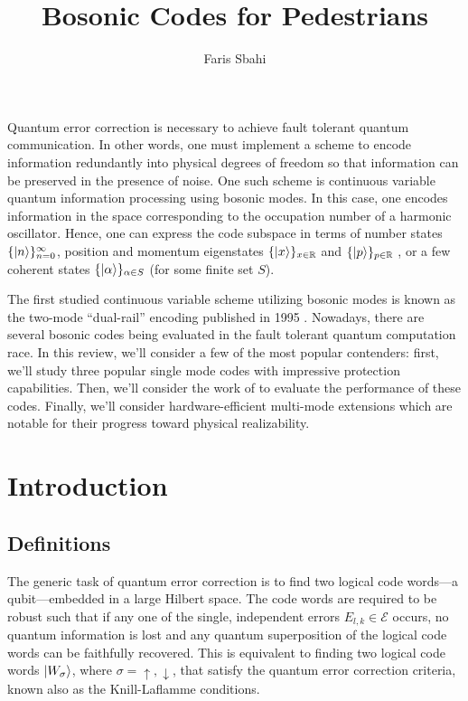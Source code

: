 \documentclass[12]{amsart}
\title{Bosonic Codes for Pedestrians}
\author{Faris Sbahi}
\newcommand\0{\mathbf{0}}
\newcommand\RR{\mathbb{R}}
\newcommand\<{\langle}
\renewcommand\>{\rangle}
\begin{document}
\maketitle

Quantum error correction is necessary to achieve fault tolerant quantum communication. In other words, one must implement a scheme to encode information redundantly into physical degrees of freedom so that information can be preserved in the presence of noise. One such scheme is continuous variable quantum information processing using bosonic modes\cite{braunstein1998error, braunstein2005quantum, niset2008experimentally, aoki2009quantum, lloyd1998analog, lassen2010quantum}. In this case, one encodes information in the space corresponding to the occupation number of a harmonic oscillator. Hence, one can express the code subspace in terms of number states $\{\ket{n}\}^\infty_{n=0}$\cite{michael2016new}, position and momentum eigenstates $\{\ket{x}\}_{x\in\RR}$ and $\{\ket{p}\}_{p\in\RR}$ \cite{gottesman2001encoding}, or a few coherent states $\{\ket{\alpha}\}_{\alpha\in S}$ (for some finite set $S$)\cite{cochrane1999macroscopically}.

The first studied continuous variable scheme utilizing bosonic modes is known as the two-mode “dual-rail” encoding published in 1995 \cite{chuang1995simple}. Nowadays, there are several bosonic codes being evaluated in the fault tolerant quantum computation race. In this review, we'll consider a few of the most popular contenders: first, we'll study three popular single mode codes with impressive protection capabilities. Then, we'll consider the work of \cite{albert2017performance} to evaluate the performance of these codes. Finally, we'll consider hardware-efficient multi-mode extensions which are notable for their progress toward physical realizability.

\section{Introduction}

\subsection{Definitions}

The generic task of quantum error correction is to find two logical code words---a qubit---embedded in a large Hilbert space. The code words are required to be robust such that if any one of the single, independent errors $E_{l,k} \in \mathcal{E}$ occurs, no quantum information is lost and any quantum superposition of the logical code words can be faithfully recovered. This is equivalent to finding two logical code words $\ket{W_\sigma}$, where $\sigma = \uparrow, \downarrow$, that satisfy the quantum error correction criteria, known also as the Knill-Laflamme conditions\cite{nielsen2002quantum}.
\end{document}
